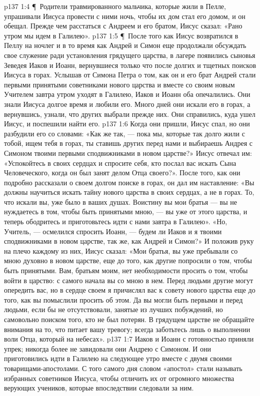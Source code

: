 \vs p137 1:4 \P\ Родители травмированного мальчика, которые жили в Пелле, упрашивали Иисуса провести с ними ночь, чтобы их дом стал его домом, и он обещал. Прежде чем расстаться с Андреем и его братом, Иисус сказал: «Рано утром мы идем в Галилею».
\vs p137 1:5 \P\ После того как Иисус возвратился в Пеллу на ночлег и в то время как Андрей и Симон еще продолжали обсуждать свое служение ради установления грядущего царства, в лагере появились сыновья Зеведея Иаков и Иоанн, вернувшиеся только что после долгих и тщетных поисков Иисуса в горах. Услышав от Симона Петра о том, как он и его брат Андрей стали первыми принятыми советниками нового царства и вместе со своим новым Учителем завтра утром уходят в Галилею, Иаков и Иоанн оба опечалились. Они знали Иисуса долгое время и любили его. Много дней они искали его в горах, а вернувшись, узнали, что других выбрали прежде них. Они справились, куда ушел Иисус, и поспешили найти его.
\vs p137 1:6 Когда они пришли, Иисус спал, но они разбудили его со словами: «Как же так, --- пока мы, которые так долго жили с тобой, ищем тебя в горах, ты ставишь других перед нами и выбираешь Андрея с Симоном твоими первыми сподвижниками в новом царстве?» Иисус отвечал им: «Успокойтесь в своих сердцах и спросите себя, кто послал вас искать Сына Человеческого, когда он был занят делом Отца своего?». После того, как они подробно рассказали о своем долгом поиске в горах, он дал им наставление: «Вы должны научиться искать тайну нового царства в своих сердцах, а не в горах. То, что искали вы, уже было в ваших душах. Воистину вы мои братья --- вы не нуждаетесь в том, чтобы быть принятыми мною, --- вы уже от этого царства, и теперь ободритесь и приготовьтесь идти с нами завтра в Галилею». «Но, Учитель, --- осмелился спросить Иоанн, --- будем ли Иаков и я твоими сподвижниками в новом царстве, так же, как Андрей и Симон?» И положив руку на плечо каждому из них, Иисус сказал: «Мои братья, вы уже пребывали со мною духовно в новом царстве, еще до того, как другие попросили о том, чтобы быть принятыми. Вам, братьям моим, нет необходимости просить о том, чтобы войти в царство: с самого начала вы со мною в нем. Перед людьми другие могут опередить вас, но в сердце своем я причислял вас к совету нового царства еще до того, как вы помыслили просить об этом. Да вы могли быть первыми и перед людьми, если бы не отсутствовали, занятые из лучших побуждений, но самовольно поиском того, кто не был потерян. В грядущем царстве не обращайте внимания на то, что питает вашу тревогу; всегда заботьтесь лишь о выполнении воли Отца, который на небесах».
\vs p137 1:7 Иаков и Иоанн с готовностью приняли упрек; никогда более не завидовали они Андрею с Симоном. И они приготовились идти в Галилею на следующее утро вместе с двумя своими товарищами\hyp{}апостолами. С того самого дня словом «апостол» стали называть избранных советников Иисуса, чтобы отличить их от огромного множества верующих учеников, которые впоследствии следовали за ним.
